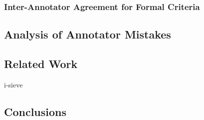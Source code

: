 \subsubsection{Inter-Annotator Agreement for Formal Criteria}

\subsection{Analysis of Annotator Mistakes}
\subsection{Related Work}
i-sieve \citet{Kouloumpis:11}
\citet{Villena-Roman:13}

\subsection{Conclusions}
